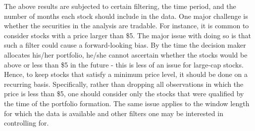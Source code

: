 The above results are subjected to certain filtering, the time period,
and the number of months each stock should include in the data. One
major challenge is whether the securities in the analysis are tradable.
For instance, it is common to consider stocks with a price larger than
\$5. The major issue with doing so is that such a filter could cause a
forward-looking bias. By the time the decision maker allocates his/her
portfolio, he/she cannot ascertain whether the stocks would be above or
less than \$5 in the future - this is less of an issue for large-cap stocks.
Hence, to keep stocks that satisfy a minimum price level, it
should be done on a recurring basis. Specifically, rather than dropping all
observations in which the price is less than \$5, one should consider only
the stocks that were qualified by the time of the portfolio formation.
The same issue applies to the window length for which the data is
available  and other filters one may be interested in controlling for.




